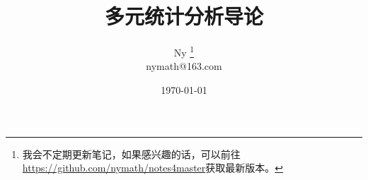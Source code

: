 \documentclass[12pt]{article}
\begin{document}
\title{\textbf{多元统计分析导论}}
\author{Ny 
\footnote{我会不定期更新笔记，如果感兴趣的话，可以前往
\href{https://github.com/nymath/notes4master}{https://github.com/nymath/notes4master}获取最新版本。}\\
nymath@163.com}
\date{\today}
\maketitle
{}
\tableofcontents
\listoffigures




\end{document}
